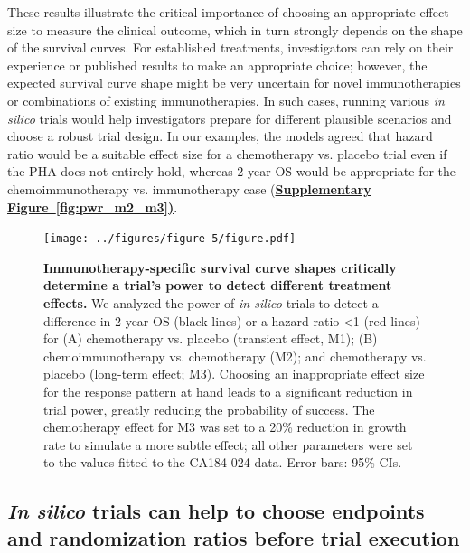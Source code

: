 \documentclass[a4paper,10pt]{article}
\newcommand{\mysupp}[2]{\hyperref[#1]{\bfseries Supplementary Figure~\ref*{#1}#2}}
\begin{document}
{
These results illustrate the critical importance of choosing an appropriate effect size to measure the 
clinical outcome, which in turn strongly depends on the shape of the survival curves. For established
treatments, investigators can rely on their experience or published results to make an appropriate choice;
however, the expected survival curve shape might be very uncertain for novel immunotherapies or combinations of existing immunotherapies. 
In such cases, running various \emph{in silico} trials would help investigators prepare for different plausible scenarios and choose a robust trial design. In our examples, the models agreed that 
hazard ratio would be a suitable effect size for a chemotherapy vs. placebo trial even if the PHA does
not entirely hold, whereas 2-year OS would be appropriate for the chemoimmunotherapy vs. immunotherapy case
(\mysupp{fig:pwr_m2_m3}).
}

\begin{figure}

\centering

\texttt{[image: ../figures/figure-5/figure.pdf]}

	\caption{
	{\bfseries Immunotherapy-specific survival curve shapes critically determine a trial's power to detect
	different treatment effects.}
	We analyzed the power of \emph{in silico} trials to detect a difference in 2-year OS (black lines)
	or a hazard ratio <1 (red lines) for (A) chemotherapy vs. placebo (transient effect, M1); 
	(B) chemoimmunotherapy vs. chemotherapy (M2); and chemotherapy vs. placebo (long-term effect; M3). 
	Choosing an inappropriate effect size for the response pattern at hand leads to a significant reduction
	in trial power, greatly reducing the probability of success. The chemotherapy effect for M3 was set to a 20\%
	reduction in growth rate to simulate a more subtle effect; all other parameters were set to the values
	fitted to the CA184-024 data. Error bars: 95\% CIs.}
	\label{fig:fig4}
\end{figure}


\subsection*{\emph{In silico} trials can help to choose endpoints and randomization ratios before trial execution}
\end{document}
